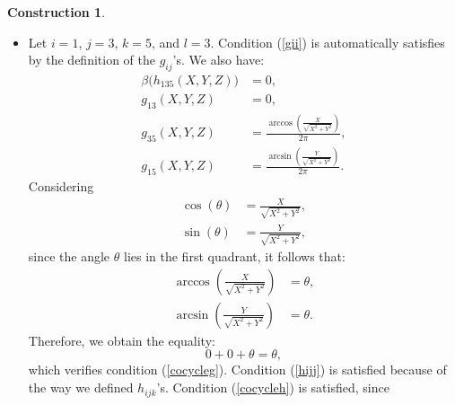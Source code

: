 \documentclass{article}
\theoremstyle{plain}
\theoremstyle{definition}
\newtheorem{const}[thm]{Construction}
\begin{document}
\begin{const}
\begin{itemize}
\begin{align*}
g_{15}(X,Y,Z) & = \frac{\arcsin(\frac{Y}{\sqrt{X^2+Y^2}})}{2\pi}.
\end{align*}
Considering
\begin{align*}
\cos(\theta) & = \frac{X}{\sqrt{X^2+Y^2}}, \\
\sin(\theta) & = \frac{Y}{\sqrt{X^2+Y^2}},
\end{align*}
since the angle $\theta$ lies in the fourth quadrant, it follows that:
\begin{align*}
\arccos(-\frac{X}{\sqrt{X^2+Y^2}}) & = \theta - \pi, \\
\arcsin(\frac{Y}{\sqrt{X^2+Y^2}}) & = \theta - 2\pi.
\end{align*}
Therefore, we obtain the equality: \\
\[
-1 + 0 + \frac{\theta - \pi}{2\pi} + \frac{1}{2} = \frac{\theta - 2\pi}{2\pi},
\]
which verifies condition (\ref{cocycleg}). Condition (\ref{hijj}) is satisfied identically because of the way we defined $h_{ijk}$'s. \\
Condition (\ref{cocycleh}) is likewise satisfied as
\[
h_{145}(X,Y,Z) = - h_{154}(X,Y,Z),
\]
and $h_{454(X,Y,Z)} = (0,[0])$.
\item Let $i=1$, $j=3$, $k=5$, and $l=3$. Condition (\ref{gii}) is automatically satisfies by the definition of the $g_{ij}$'s. We also have:
\begin{align*}
\beta\Big(h_{135}(X,Y,Z)\Big) & = 0, \\
g_{13}(X,Y,Z) & = 0, \\
g_{35}(X,Y,Z) & = \frac{\arccos(\frac{X}{\sqrt{X^2+Y^2}})}{2\pi}, \\
g_{15}(X,Y,Z) & = \frac{\arcsin(\frac{Y}{\sqrt{X^2+Y^2}})}{2\pi}.
\end{align*}
Considering
\begin{align*}
\cos(\theta) & = \frac{X}{\sqrt{X^2+Y^2}}, \\
\sin(\theta) & = \frac{Y}{\sqrt{X^2+Y^2}},
\end{align*}
since the angle $\theta$ lies in the first quadrant, it follows that:
\begin{align*}
\arccos(\frac{X}{\sqrt{X^2+Y^2}}) & = \theta, \\
\arcsin(\frac{Y}{\sqrt{X^2+Y^2}}) & = \theta.
\end{align*}
Therefore, we obtain the equality: \\
\[
0 + 0 +  \theta = \theta,
\]
which verifies condition (\ref{cocycleg}). Condition (\ref{hijj}) is satisfied because of the way we defined $h_{ijk}$'s.
Condition (\ref{cocycleh}) is satisfied, since

\end{itemize}
\end{const}
\end{document}

